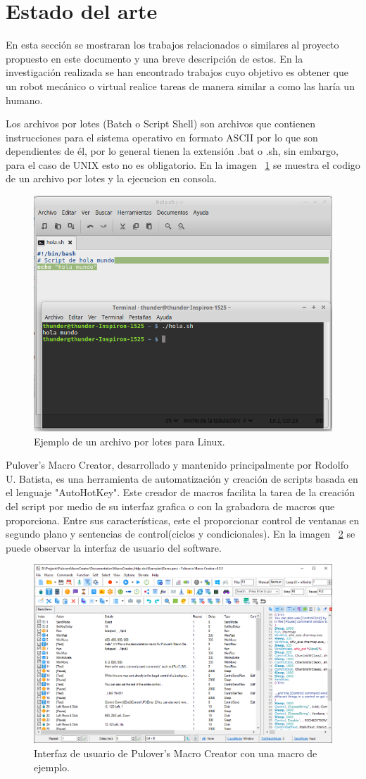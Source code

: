\section{Estado del arte}
En esta sección se mostraran los trabajos relacionados o similares al proyecto
 propuesto en este documento y una breve descripción de estos. En la
 investigación realizada se han encontrado trabajos cuyo objetivo es obtener
 que un robot mecánico o virtual realice tareas de manera similar a como las
 haría un humano. 


Los archivos por lotes (Batch o Script Shell) \cite{Silberschatz1999} son
 archivos que contienen instrucciones para el sistema operativo en formato
 ASCII por lo que son dependientes de él, por lo general tienen la extensión
 .bat o .sh, sin embargo, para el caso de UNIX esto no es obligatorio. En la
 imagen ~\ref{fig:script} se muestra el codigo de un archivo por lotes y la 
 ejecucion en consola.


\begin{figure}[H]
\centering
\includegraphics[width=0.5\columnwidth]{CapituloI/Imagenes/Script.png}
\caption{Ejemplo de un archivo por lotes para Linux.}
\label{fig:script}
\end{figure}


Pulover's Macro Creator\cite{Batista}, desarrollado y mantenido principalmente
 por Rodolfo U. Batista, es una herramienta de automatización y creación de
 scripts basada en el lenguaje "AutoHotKey". Este  creador de macros facilita
 la tarea de la creación del script por medio de  su interfaz grafica o con la
 grabadora de macros que proporciona. Entre sus características, este el
 proporcionar  control de ventanas en segundo plano y sentencias de
 control(ciclos y condicionales). En la imagen ~\ref{fig:macros} se puede observar la interfaz de usuario del software.


\begin{figure}[H]
\centering
\includegraphics[width=0.5\columnwidth]{CapituloI/Imagenes/Macros.png}
\caption{Interfaz de usuario de Pulover's Macro Creator con una macro de
 ejemplo.}
\label{fig:macros}
\end{figure}



